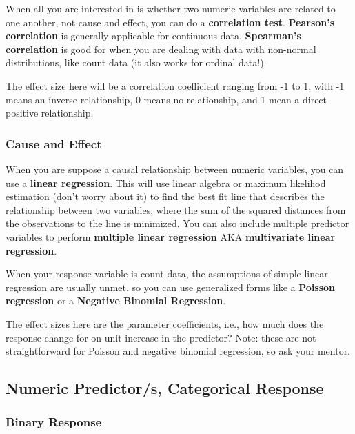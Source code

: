 \documentclass[
  letterpaper,
  DIV=11,
  numbers=noendperiod]{scrreprt}
\begin{document}
When all you are interested in is whether two numeric variables are
related to one another, not cause and effect, you can do a
\textbf{correlation test}. \textbf{Pearson's correlation} is generally
applicable for continuous data. \textbf{Spearman's correlation} is good
for when you are dealing with data with non-normal distributions, like
count data (it also works for ordinal data!).

The effect size here will be a correlation coefficient ranging from -1
to 1, with -1 means an inverse relationship, 0 means no relationship,
and 1 mean a direct positive relationship.

\hypertarget{sec-reg}{%
\subsubsection{Cause and Effect}\label{sec-reg}}

When you are suppose a causal relationship between numeric variables,
you can use a \textbf{linear regression}. This will use linear algebra
or maximum likelihod estimation (don't worry about it) to find the best
fit line that describes the relationship between two variables; where
the sum of the squared distances from the observations to the line is
minimized. You can also include multiple predictor variables to perform
\textbf{multiple linear regression} AKA \textbf{multivariate linear
regression}.

When your response variable is count data, the assumptions of simple
linear regression are usually unmet, so you can use generalized forms
like a \textbf{Poisson regression} or a \textbf{Negative Binomial
Regression}.

The effect sizes here are the parameter coefficients, i.e., how much
does the response change for on unit increase in the predictor? Note:
these are not straightforward for Poisson and negative binomial
regression, so ask your mentor.

\hypertarget{numeric-predictors-categorical-response}{%
\subsection{Numeric Predictor/s, Categorical
Response}\label{numeric-predictors-categorical-response}}

\hypertarget{sec-bin}{%
\subsubsection{Binary Response}\label{sec-bin}}
\end{document}
